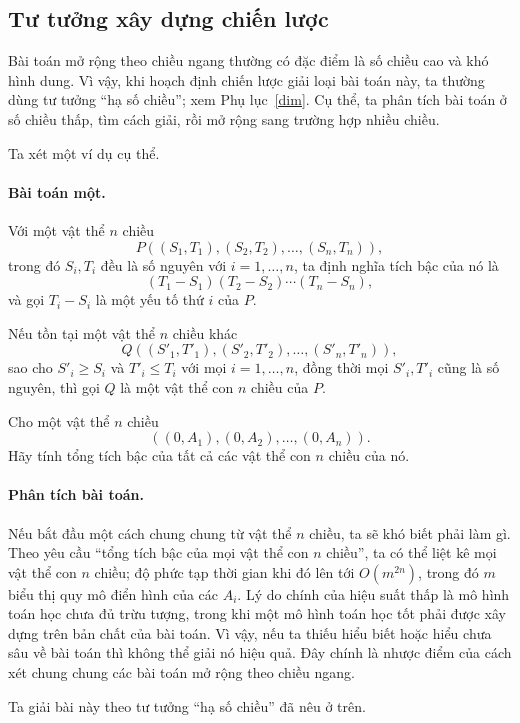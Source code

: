 \documentclass[11pt]{article}
\begin{document}
\subsection{Tư tưởng xây dựng chiến lược}

Bài toán mở rộng theo chiều ngang thường có đặc điểm là số chiều cao và khó
hình dung. Vì vậy, khi hoạch định chiến lược giải loại bài toán này, ta
thường dùng tư tưởng ``hạ số chiều''; xem Phụ lục~\ref{dim}. Cụ thể, ta phân
tích bài toán ở số chiều thấp, tìm cách giải, rồi mở rộng sang trường hợp
nhiều chiều.

Ta xét một ví dụ cụ thể.

\paragraph{Bài toán một.}
Với một vật thể \(n\) chiều
\[
P((S_1,T_1),(S_2,T_2),\ldots,(S_n,T_n)),
\]
trong đó \(S_i,T_i\) đều là số nguyên với \(i=1,\ldots,n\), ta định nghĩa tích
bậc của nó là
\[
(T_1-S_1)(T_2-S_2)\cdots(T_n-S_n),
\]
và gọi \(T_i-S_i\) là một yếu tố thứ \(i\) của \(P\).

Nếu tồn tại một vật thể \(n\) chiều khác
\[
Q((S'_1,T'_1),(S'_2,T'_2),\ldots,(S'_n,T'_n)),
\]
sao cho \(S'_i\ge S_i\) và \(T'_i\le T_i\) với mọi \(i=1,\ldots,n\), đồng
thời mọi \(S'_i,T'_i\) cũng là số nguyên, thì gọi \(Q\) là một vật thể con
\(n\) chiều của \(P\).

Cho một vật thể \(n\) chiều
\[
((0,A_1),(0,A_2),\ldots,(0,A_n)).
\]
Hãy tính tổng tích bậc của tất cả các vật thể con \(n\) chiều của nó.

\paragraph{Phân tích bài toán.}
Nếu bắt đầu một cách chung chung từ vật thể \(n\) chiều, ta sẽ khó biết phải
làm gì. Theo yêu cầu ``tổng tích bậc của mọi vật thể con \(n\) chiều'', ta có
thể liệt kê mọi vật thể con \(n\) chiều; độ phức tạp thời gian khi đó lên tới
\(O(m^{2n})\), trong đó \(m\) biểu thị quy mô điển hình của các \(A_i\). Lý
do chính của hiệu suất thấp là mô hình toán học chưa đủ trừu tượng, trong khi
một mô hình toán học tốt phải được xây dựng trên bản chất của bài toán. Vì
vậy, nếu ta thiếu hiểu biết hoặc hiểu chưa sâu về bài toán thì không thể giải
nó hiệu quả. Đây chính là nhược điểm của cách xét chung chung các bài toán mở
rộng theo chiều ngang.

Ta giải bài này theo tư tưởng ``hạ số chiều'' đã nêu ở trên.
\end{document}
